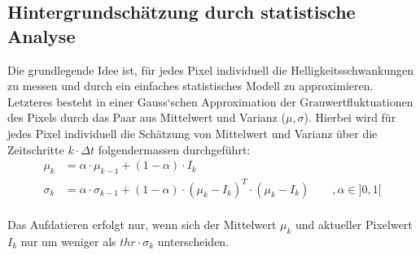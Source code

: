 \subsection{Hintergrundschätzung durch statistische Analyse}
Die grundlegende Idee ist, für jedes Pixel individuell die Helligkeitsschwankungen zu messen und durch ein einfaches statistisches Modell zu approximieren. Letzteres besteht in einer Gauss‘schen Approximation der Grauwertfluktuationen des Pixels durch das Paar aus Mittelwert und 
Varianz ($\mu, \sigma$). Hierbei wird für jedes Pixel individuell die Schätzung von Mittelwert und Varianz über die Zeitschritte $k\cdot \Delta t$ folgendermassen durchgeführt:
\[
	\begin{aligned}
		\mu_k &= \alpha \cdot \mu_{k-1} + (1 - \alpha) \cdot I_k \\
		\sigma_k &= \alpha \cdot \sigma_{k-1} + (1 - \alpha) \cdot (\mu_k - I_k)^T \cdot (\mu_k - I_k) \qquad, \alpha \in ]0,1[
	\end{aligned}
\]\\
Das Aufdatieren erfolgt nur, wenn sich der Mittelwert $\mu_k$ und aktueller Pixelwert $I_k$ nur um weniger als $thr \cdot \sigma_k$ unterscheiden.
